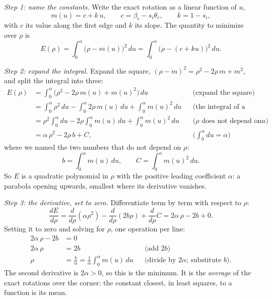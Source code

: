 \emph{Step 1: name the constants.} Write the exact rotation as a linear function of $u$,
\begin{equation*}
m(u) = c + k\, u, \qquad c = \beta_e - s_i\theta_e, \qquad k = 1 - s_i ,
\end{equation*}
with $c$ its value along the first edge and $k$ its slope. The quantity to minimize over $\rho$ is
\begin{equation*}
E(\rho) = \int_0^\alpha \big(\rho - m(u)\big)^2\, du = \int_0^\alpha \big(\rho - (c + k u)\big)^2\, du .
\end{equation*}

\emph{Step 2: expand the integral.} Expand the square, $(\rho - m)^2 = \rho^2 - 2\rho\, m + m^2$, and split the integral into three:
\begin{align*}
E(\rho) &= \int_0^\alpha \big(\rho^2 - 2\rho\, m(u) + m(u)^2\big)\, du && \text{(expand the square)} \\
&= \int_0^\alpha \rho^2\, du - \int_0^\alpha 2\rho\, m(u)\, du + \int_0^\alpha m(u)^2\, du && \text{(the integral of a sum)} \\
&= \rho^2 \int_0^\alpha du - 2\rho \int_0^\alpha m(u)\, du + \int_0^\alpha m(u)^2\, du && \text{($\rho$ does not depend on $u$)} \\
&= \alpha\, \rho^2 - 2\rho\, b + C, && \text{($\textstyle\int_0^\alpha du = \alpha$)}
\end{align*}
where we named the two numbers that do not depend on $\rho$:
\begin{equation*}
b = \int_0^\alpha m(u)\, du, \qquad C = \int_0^\alpha m(u)^2\, du .
\end{equation*}
So $E$ is a quadratic polynomial in $\rho$ with the positive leading coefficient $\alpha$: a parabola opening upwards, smallest where its derivative vanishes.

\emph{Step 3: the derivative, set to zero.} Differentiate term by term with respect to $\rho$:
\begin{equation*}
\frac{dE}{d\rho} = \frac{d}{d\rho}(\alpha\rho^2) - \frac{d}{d\rho}(2b\rho) + \frac{d}{d\rho}C = 2\alpha\,\rho - 2b + 0 .
\end{equation*}
Setting it to zero and solving for $\rho$, one operation per line:
\begin{align*}
2\alpha\,\rho - 2b &= 0 \\
2\alpha\,\rho &= 2b && \text{(add $2b$)} \\
\rho &= \frac{b}{\alpha} = \frac{1}{\alpha} \int_0^\alpha m(u)\, du && \text{(divide by $2\alpha$; substitute $b$).}
\end{align*}
The second derivative is $2\alpha > 0$, so this is the minimum. It is the \emph{average} of the exact rotations over the corner: the constant closest, in least squares, to a function is its mean.

